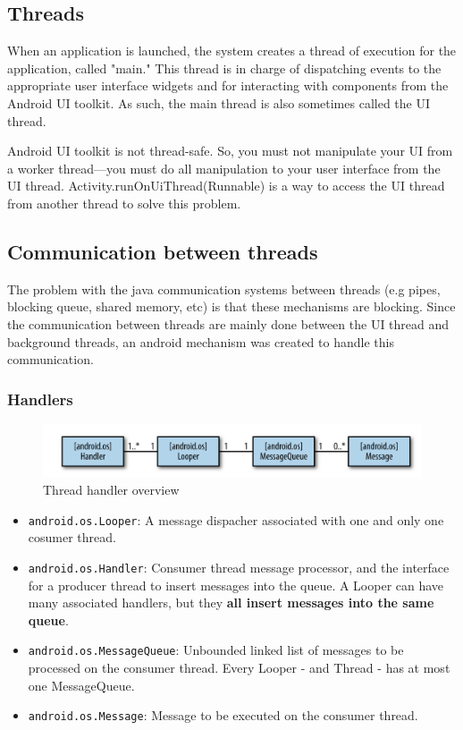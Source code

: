 \subsection{Threads}
When an application is launched, the system creates a thread of execution for the 
application, called "main." This thread is in charge of dispatching events to the 
appropriate user interface widgets and for interacting with components from the Android UI 
toolkit. As such, the main thread is also sometimes called the UI thread. 


Android UI toolkit is not thread-safe. So, you must not manipulate your UI from a 
worker thread—you must do all manipulation to your user interface from the UI thread. 
Activity.runOnUiThread(Runnable) is a way to access the UI thread from another thread to 
solve this problem.

\subsection{Communication between threads}
The problem with the java communication systems between threads (e.g pipes, blocking queue, 
shared memory, etc) is that these mechanisms are blocking. Since the communication between threads
are mainly done between the UI thread and background threads, an android mechanism was created to handle
this communication. 

\subsubsection{Handlers}

\begin{figure}[h]
\centering
\includegraphics[width=0.8\linewidth]{figures/05_thread_handler_overview.png}
\caption{Thread handler overview}
\label{fig:thread_handler_overview}
\end{figure}

\begin{itemize}
    \item \texttt{android.os.Looper}: A message dispacher associated with one and only 
    one cosumer thread. 
    \item \texttt{android.os.Handler}: Consumer thread message processor, and 
    the interface for a producer thread to insert messages into the queue.
    A Looper can have many associated handlers, but they \textbf{all insert messages into 
    the same queue}.
    \item \texttt{android.os.MessageQueue}: Unbounded linked list of messages to be processed 
    on the consumer thread. Every Looper - and Thread - has at most one MessageQueue.
    \item \texttt{android.os.Message}: Message to be executed on the consumer thread.
\end{itemize}



